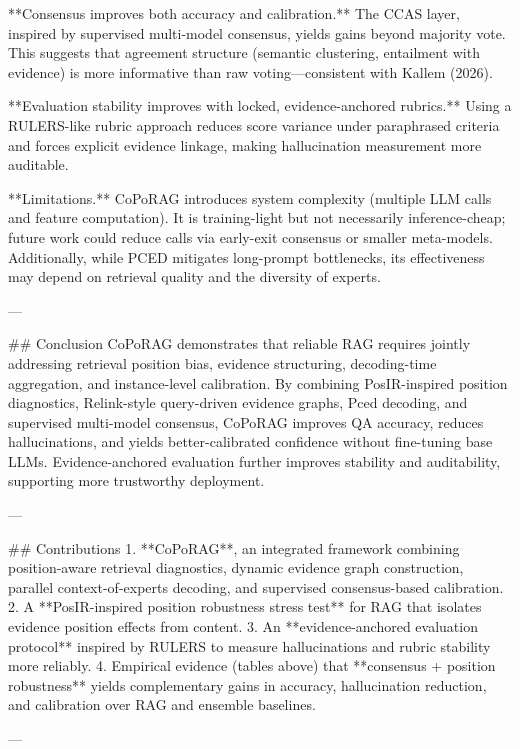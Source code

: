 **Consensus improves both accuracy and calibration.** The CCAS layer, inspired by supervised multi-model consensus, yields gains beyond majority vote. This suggests that agreement structure (semantic clustering, entailment with evidence) is more informative than raw voting—consistent with Kallem (2026).

**Evaluation stability improves with locked, evidence-anchored rubrics.** Using a RULERS-like rubric approach reduces score variance under paraphrased criteria and forces explicit evidence linkage, making hallucination measurement more auditable.

**Limitations.** CoPoRAG introduces system complexity (multiple LLM calls and feature computation). It is training-light but not necessarily inference-cheap; future work could reduce calls via early-exit consensus or smaller meta-models. Additionally, while PCED mitigates long-prompt bottlenecks, its effectiveness may depend on retrieval quality and the diversity of experts.

---

## Conclusion  
CoPoRAG demonstrates that reliable RAG requires jointly addressing retrieval position bias, evidence structuring, decoding-time aggregation, and instance-level calibration. By combining PosIR-inspired position diagnostics, Relink-style query-driven evidence graphs, Pced decoding, and supervised multi-model consensus, CoPoRAG improves QA accuracy, reduces hallucinations, and yields better-calibrated confidence without fine-tuning base LLMs. Evidence-anchored evaluation further improves stability and auditability, supporting more trustworthy deployment.

---

## Contributions  
1. **CoPoRAG**, an integrated framework combining position-aware retrieval diagnostics, dynamic evidence graph construction, parallel context-of-experts decoding, and supervised consensus-based calibration.  
2. A **PosIR-inspired position robustness stress test** for RAG that isolates evidence position effects from content.  
3. An **evidence-anchored evaluation protocol** inspired by RULERS to measure hallucinations and rubric stability more reliably.  
4. Empirical evidence (tables above) that **consensus + position robustness** yields complementary gains in accuracy, hallucination reduction, and calibration over RAG and ensemble baselines.

---
